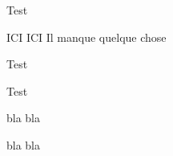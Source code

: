 \documentclass[a4paper]{article}
\newif\ifrender
\newenvironment{toRender}{\rendertrue}{}
\begin{document}
Test \clearpage

\begin{toRender}
  ICI \clearpage
  ICI Il manque quelque chose
\end{toRender}

Test

Test \clearpage

\rendertrue
  bla \clearpage
  bla \clearpage
\renderfalse

bla \clearpage
bla \clearpage
\end{document}
